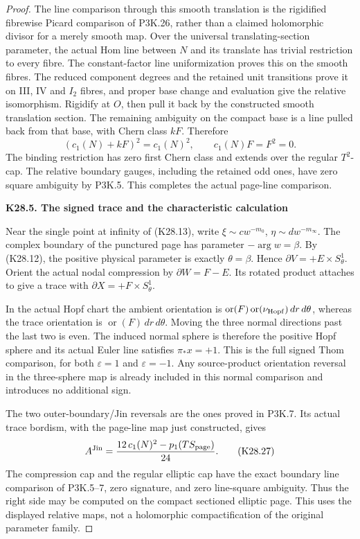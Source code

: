 \begin{proof}
The line comparison through this smooth translation is the
rigidified fibrewise Picard comparison of P3K.26, rather than
a claimed holomorphic divisor for a merely smooth map. Over the
universal translating-section parameter, the actual Hom line
between \(N\) and its translate has trivial restriction to every
fibre. The constant-factor line uniformization proves this on the
smooth fibres. The reduced component degrees and the retained
unit transitions prove it on III, IV and \(I_2\) fibres, and
proper base change and evaluation give the relative isomorphism.
Rigidify at \(O\), then pull it back by the constructed smooth
translation section. The remaining ambiguity on the compact
base is a line pulled back from that base, with Chern class
\(kF\). Therefore
\[
                    (c_1(N)+kF)^2=c_1(N)^2,
 \qquad c_1(N)F=F^2=0 .
 \tag{K28.26}
\]
The binding restriction has zero first Chern class and extends over
the regular \(T^2\)-cap. The relative boundary gauges, including
the retained odd ones, have zero square ambiguity by P3K.5.
This completes the actual page-line comparison.

\par

\medskip\noindent\textbf{K28.5. The signed trace and the characteristic calculation}

\par\nobreak

Near the single point at infinity of (K28.13), write
\(\xi\sim c w^{-m_0}\), \(\eta\sim d w^{-m_\infty}\).
The complex boundary of the punctured page has parameter
\(-\arg w=\beta\). By (K28.12), the positive physical parameter
is exactly \(\theta=\beta\). Hence
\(\partial V=+E\times S^1_\theta\).
Orient the actual nodal compression by \(\partial W=F-E\).
Its rotated product attaches to give a trace with
\(\partial X=+F\times S^1_\theta\).

In the actual Hopf chart the ambient orientation is
\(\operatorname{or}(F)\operatorname{or}(\nu_{\rm Hopf})\,dr\,d\theta\),
whereas the trace orientation is
\(\operatorname{or}(F)\,dr\,d\theta\).
Moving the three normal directions past the last two is even.
The induced normal sphere is therefore the positive Hopf sphere
and its actual Euler line satisfies \(\pi_*x=+1\).
This is the full signed Thom comparison, for both
\(\varepsilon=1\) and \(\varepsilon=-1\). Any source-product
orientation reversal in the three-sphere map is already included
in this normal comparison and introduces no additional sign.

The two outer-boundary/Jin reversals are the ones proved in
P3K.7. Its actual trace bordism, with the page-line map just
constructed, gives
\[
            A^{\rm Jin}
              =\frac{12\,c_1(N)^2-p_1(TS_{\rm page})}{24}.
 \tag{K28.27}
\]
The compression cap and the regular elliptic cap have the exact
boundary line comparison of P3K.5--7, zero signature, and zero
line-square ambiguity. Thus the right side may be computed on
the compact sectioned elliptic page. This uses the displayed
relative maps, not a holomorphic compactification of the original
parameter family.


\end{proof}
